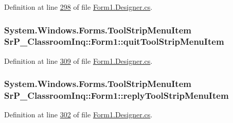\-Definition at line \hyperlink{_form1_8_designer_8cs_source_l00298}{298} of file \hyperlink{_form1_8_designer_8cs_source}{\-Form1.\-Designer.\-cs}.

\hypertarget{class_sr_p___classroom_inq_1_1_form1_a21aff2285e9e1a058884bcb1b016b7f5}{
\subsubsection[{quit\-Tool\-Strip\-Menu\-Item}]{\setlength{\rightskip}{0pt plus 5cm}\-System.\-Windows.\-Forms.\-Tool\-Strip\-Menu\-Item {\bf \-Sr\-P\-\_\-\-Classroom\-Inq\-::\-Form1\-::quit\-Tool\-Strip\-Menu\-Item}}}
\label{class_sr_p___classroom_inq_1_1_form1_a21aff2285e9e1a058884bcb1b016b7f5}


\-Definition at line \hyperlink{_form1_8_designer_8cs_source_l00309}{309} of file \hyperlink{_form1_8_designer_8cs_source}{\-Form1.\-Designer.\-cs}.

\hypertarget{class_sr_p___classroom_inq_1_1_form1_acc6ff110ce8c8a1171c0a1d30ca10a9c}{
\subsubsection[{reply\-Tool\-Strip\-Menu\-Item}]{\setlength{\rightskip}{0pt plus 5cm}\-System.\-Windows.\-Forms.\-Tool\-Strip\-Menu\-Item {\bf \-Sr\-P\-\_\-\-Classroom\-Inq\-::\-Form1\-::reply\-Tool\-Strip\-Menu\-Item}}}
\label{class_sr_p___classroom_inq_1_1_form1_acc6ff110ce8c8a1171c0a1d30ca10a9c}


\-Definition at line \hyperlink{_form1_8_designer_8cs_source_l00302}{302} of file \hyperlink{_form1_8_designer_8cs_source}{\-Form1.\-Designer.\-cs}.

